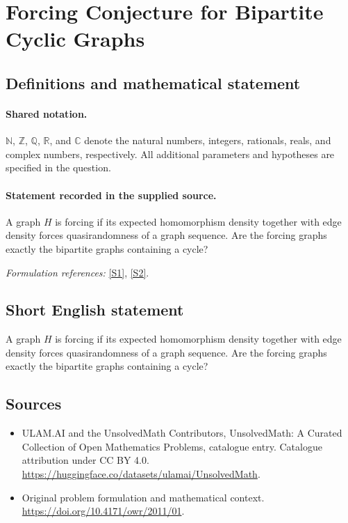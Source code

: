 \documentclass[11pt]{article}
\newcommand{\sref}[2]{\hyperlink{source:#1:#2}{[S#2]}}
\begin{document}
\section{Forcing Conjecture for Bipartite Cyclic Graphs}\label{statement}

\subsection{Definitions and mathematical statement}

\paragraph{Shared notation.}$\mathbb N$, $\mathbb Z$, $\mathbb Q$, $\mathbb R$, and $\mathbb C$ denote the natural numbers, integers, rationals, reals, and complex numbers, respectively. All additional parameters and hypotheses are specified in the question.


\paragraph{Statement recorded in the supplied source.}
A graph $H$ is forcing if its expected homomorphism density together with edge density forces quasirandomness of a graph sequence. Are the forcing graphs exactly the bipartite graphs containing a cycle?
\par\smallskip\textit{Formulation references:} \sref{statement}{1}, \sref{statement}{2}.
\subsection{Short English statement}
A graph $H$ is forcing if its expected homomorphism density together with edge density forces quasirandomness of a graph sequence. Are the forcing graphs exactly the bipartite graphs containing a cycle?
\subsection{Sources}
\begin{itemize}
\item[\hypertarget{source:statement:1}{S1}] ULAM.AI and the UnsolvedMath Contributors, UnsolvedMath: A Curated Collection of Open Mathematics Problems, catalogue entry. Catalogue attribution under CC BY 4.0.
\url{https://huggingface.co/datasets/ulamai/UnsolvedMath}.
\item[\hypertarget{source:statement:2}{S2}] Original problem formulation and mathematical context.
\url{https://doi.org/10.4171/owr/2011/01}.
\end{itemize}
\label{end:statement}
\end{document}
